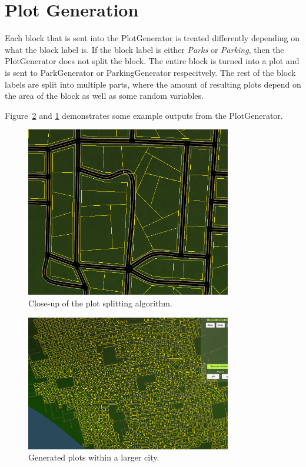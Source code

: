 \section{Plot Generation}
Each block that is sent into the PlotGenerator is treated differently depending on what the block label is. 
If the block label is either \textit{Parks} or \textit{Parking}, then the PlotGenerator does not split the block. 
The entire block is turned into a plot and is sent to ParkGenerator or ParkingGenerator respecitvely.
The rest of the block labels are split into multiple parts, where the amount of resulting plots depend on the area of the block as well as some random variables. 

Figure~\ref{fig:plot} and \ref{fig:plot2} demonstrates some example outputs from the PlotGenerator.

\begin{figure}[H]
  \centering

  \includegraphics[width=0.8\textwidth]{figure/plot2.png}
  \caption{Close-up of the plot splitting algorithm.}

  \label{fig:plot2}
\end{figure}

\begin{figure}[H]
  \centering

  \includegraphics[width=0.8\textwidth]{figure/plot.png}
  \caption{Generated plots within a larger city.}

  \label{fig:plot}
\end{figure}

